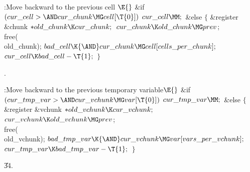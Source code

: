 \B{}:Move  backward to the previous cell%
\X${}\E{}$\6
\&{if} ${}(\\{cur\_cell}>{\AND}\\{cur\_chunk}\MG\\{cell}[\T{0}]){}$\1\5
${}\\{cur\_cell}\MM;{}$\2\6
\&{else}\5
${}\{{}$\1\6
\&{register} \&{chunk} ${}{*}\\{old\_chunk}\K\\{cur\_chunk};{}$\7
${}\\{cur\_chunk}\K\\{old\_chunk}\MG\\{prev}{}$;\5
\\{free}(\\{old\_chunk});\6
${}\\{bad\_cell}\K{\AND}\\{cur\_chunk}\MG\\{cell}[\\{cells\_per\_chunk}];{}$\6
${}\\{cur\_cell}\K\\{bad\_cell}-\T{1};{}$\6
\4${}\}{}$\2\par
{}.\fi

\B{}:Move  backward to the previous
temporary variable\X${}\E{}$\6
\&{if} ${}(\\{cur\_tmp\_var}>{\AND}\\{cur\_vchunk}\MG\\{var}[\T{0}]){}$\1\5
${}\\{cur\_tmp\_var}\MM;{}$\2\6
\&{else}\5
${}\{{}$\1\6
\&{register} \&{vchunk} ${}{*}\\{old\_vchunk}\K\\{cur\_vchunk};{}$\7
${}\\{cur\_vchunk}\K\\{old\_vchunk}\MG\\{prev}{}$;\5
\\{free}(\\{old\_vchunk});\6
${}\\{bad\_tmp\_var}\K{\AND}\\{cur\_vchunk}\MG\\{var}[\\{vars\_per%
\_vchunk}];{}$\6
${}\\{cur\_tmp\_var}\K\\{bad\_tmp\_var}-\T{1};{}$\6
\4${}\}{}$\2\par
\U34.\fi

